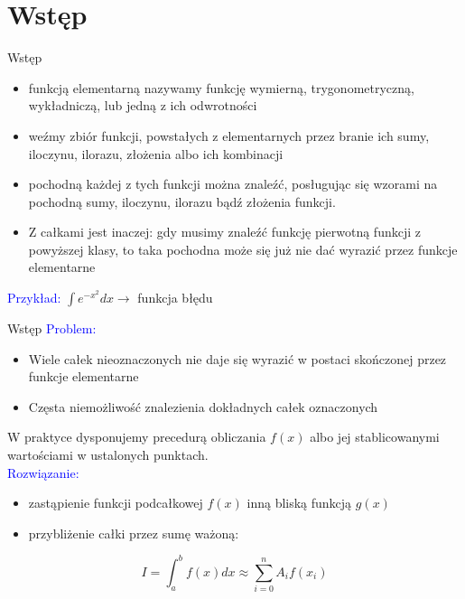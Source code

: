 \section{Wstęp}
	\begin{frame}{Wstęp}
	\begin{itemize}
	    \item  funkcją elementarną nazywamy funkcję wymierną, trygonometryczną, wykładniczą, lub jedną z ich odwrotności
	     \item weźmy  zbiór funkcji, powstałych z elementarnych przez branie ich sumy, iloczynu, ilorazu, złożenia albo ich kombinacji
	 
	 \item  pochodną każdej z tych funkcji można znaleźć, posługując się wzorami na pochodną sumy, iloczynu, ilorazu bądź złożenia funkcji.
	   
	   \item Z całkami jest inaczej: gdy musimy znaleźć funkcję pierwotną funkcji z powyższej klasy, to taka pochodna może się już nie dać wyrazić przez funkcje elementarne 
	   \end{itemize}
	   	\textcolor{blue}{Przykład:}
	$\int e^{-x^{2}} dx \rightarrow $ funkcja błędu
		
	\end{frame}
	\begin{frame}{Wstęp} 
		\textcolor{blue}{Problem:}

		\begin{itemize}
			\item Wiele całek nieoznaczonych nie daje się wyrazić w postaci skończonej przez funkcje elementarne
			\item Częsta niemożliwość znalezienia dokładnych całek oznaczonych
    	\end{itemize}

    	W praktyce dysponujemy precedurą obliczania $f(x)$ albo jej stablicowanymi wartościami w ustalonych punktach.\\
    	
    	\textcolor{blue}{Rozwiązanie:}
    	\begin{itemize}
    	\item zastąpienie funkcji podcałkowej $f(x)$ inną bliską funkcją $g(x)$
    	\item przybliżenie całki przez sumę ważoną:
    	\end{itemize}
    	$$I=\int_{a}^{b}f(x)dx \approx\sum_{i=0}^{n}A_{i}f(x_i)$$
   	 	
	\end{frame}
    
